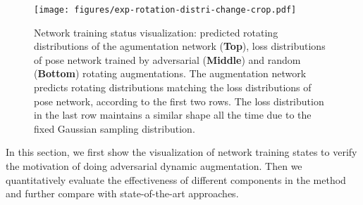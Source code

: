 \documentclass[10pt,twocolumn,letterpaper]{article}
\begin{document}
% 
\begin{figure*}[t!]
\centering
\texttt{[image: figures/exp-rotation-distri-change-crop.pdf]}
\caption{Network training status visualization: predicted rotating distributions of the agumentation network ({\bf Top}), loss distributions of pose network trained by adversarial ({\bf Middle}) and random ({\bf Bottom}) rotating augmentations. The augmentation network predicts rotating distributions matching the loss distributions of pose network, according to the first two rows. The loss distribution in the last row maintains a similar shape all the time due to the fixed Gaussian sampling distribution.}
\label{fig:distri}
\end{figure*}%
In this section, we first show the visualization of network training states to verify the motivation of doing adversarial dynamic augmentation. Then we quantitatively evaluate the effectiveness of different components in the method and further compare with state-of-the-art approaches. 
\end{document}
